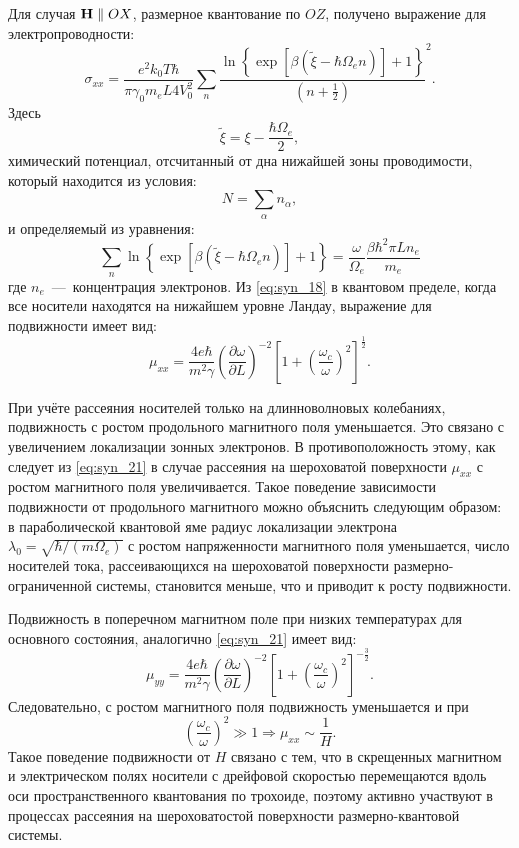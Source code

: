 Для случая $\boldsymbol{\mathbf{H}} \parallel OX$, размерное квантование по $OZ$, получено выражение для электропроводности:
\begin{equation} \label{eq:syn_18}
\sigma_{xx} = \frac{e^2 k_0 T \hbar}{\pi \gamma_0 m_e L 4 V^2_0} \sum_n{\frac{\ln{\left\{\exp{\left[\beta \left(\widetilde{\xi}-\hbar \Omega_e n\right)\right]}+1\right\}}}{\left(n+\frac{1}{2}\right)}^2}. 
\end{equation}
Здесь
\[
\widetilde{\xi} = \xi -\frac{\hbar\Omega_e }{2},
\]
химический потенциал, отсчитанный от дна нижайшей зоны проводимости, который находится из условия:
\begin{equation} \label{eq:syn_19}
N=\sum_{\alpha }{n_{\alpha}},
\end{equation}
и определяемый из уравнения:
\begin{equation} \label{eq:syn_20}
\sum_n{\ln{\left\{\exp{\left[\beta \left(\widetilde{\xi}-\hbar \Omega_e n\right)\right]}+1\right\}}}=\frac{\omega }{\Omega_e } \frac{\beta \hbar^2 \pi L n_e}{m_e}
\end{equation}
где $n_e$~---~концентрация электронов.
Из \eqref{eq:syn_18} в квантовом пределе, когда все носители находятся на нижайшем уровне Ландау, выражение для подвижности имеет вид:
\begin{equation} \label{eq:syn_21}
\mu _{xx} =\frac{4e\hbar }{m^2 \gamma } \left(\frac{\partial \omega }{\partial L} \right)^{-2} \left[1+\left(\frac{\omega_c}{\omega } \right)^2 \right]^{\frac{1}{2} }.
\end{equation}

При учёте рассеяния носителей только на длинноволновых колебаниях, подвижность с ростом продольного магнитного поля уменьшается. Это связано с увеличением локализации зонных электронов. В противоположность этому, как следует из \eqref{eq:syn_21} в случае рассеяния на шероховатой поверхности $\mu_{xx} $ с ростом магнитного поля увеличивается. Такое поведение зависимости подвижности от продольного магнитного можно объяснить следующим образом: в параболической квантовой яме радиус локализации электрона $\lambda_0 =\sqrt{\hbar / (m\Omega_e) } $ с ростом напряженности магнитного поля уменьшается, число носителей тока, рассеивающихся на шероховатой поверхности размерно-ограниченной системы, становится меньше, что и приводит к росту подвижности.

Подвижность в поперечном магнитном поле при низких температурах для основного состояния, аналогично \eqref{eq:syn_21} имеет вид:
\begin{equation} \label{eq:syn_22}
\mu_{yy} =\frac{4e\hbar }{m^{2} \gamma } \left(\frac{\partial \omega }{\partial L} \right)^{-2} \left[1+\left(\frac{\omega _{c} }{\omega } \right)^{2} \right]^{-\frac{3}{2} }.
\end{equation}
Следовательно, с ростом магнитного поля подвижность уменьшается и при
\[
\left(\frac{\omega_c}{\omega } \right)^2 \gg 1 \Rightarrow \mu_{xx} \sim \frac{1}{H} .
\]
Такое поведение подвижности от $H$ связано с тем, что в скрещенных магнитном и электрическом полях носители с дрейфовой скоростью перемещаются вдоль оси пространственного квантования по трохоиде, поэтому активно участвуют в процессах рассеяния на шероховатостой поверхности размерно-квантовой системы. 

